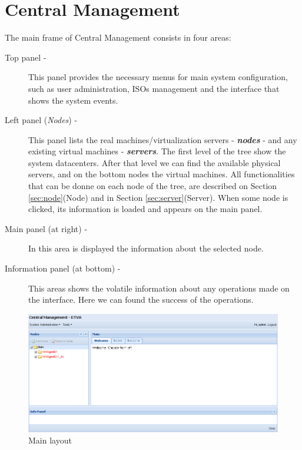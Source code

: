 
\chapter{\textsf{Central Management}}

The main frame of Central Management consists in four areas:

\begin{description}
	\item[Top panel -] This panel provides the necessary menus for main system configuration, such as user administration, ISOs management and the interface that shows the system events.
	\item[Left panel (\emph{Nodes}) -] This panel lists the real machines/virtualization servers - {\bf\emph{nodes}} - and any existing virtual machines - {\bf\emph{servers}}. The first level of the tree show the system datacenters. After that level we can find the available physical servers, and on the bottom nodes the virtual machines. All functionalities that can be donne on each node of the tree, are described on Section \ref{sec:node}(Node) and in Section \ref{sec:server}(Server). When some node is clicked, its information is loaded and appears on the main panel.
	\item[Main panel (at right) -] In this area is displayed the information about the selected node.
	\item[Information panel (at bottom) -] This areas shows the volatile information about any operations made on the interface. Here we can found the success of the operations.
\end{description}

\begin{figure}[H]
	\begin{center}
	\includegraphics[scale=0.45]{screenshots/principal.png}
	\caption{Main layout}
	\label{fig:principal}
	\end{center}
\end{figure}

